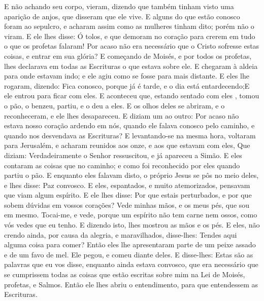 {  E não achando seu corpo, vieram, dizendo que também tinham visto uma aparição de anjos, que disseram que ele vive.
  E alguns do que estão conosco foram ao sepulcro, e
{} acharam assim como as mulheres tinham dito; porém não o viram.
  E ele lhes disse: Ó tolos, e que demoram no coração para crerem em tudo o que os profetas falaram!
  Por acaso não era necessário que o Cristo sofresse estas coisas, e
{} entrar em sua glória?
  E começando de Moisés, e por todos os profetas, lhes declarava em todas as Escrituras o que estava
{} sobre ele.
  E chegaram à aldeia para onde estavam indo; e ele agiu como se fosse para
{} mais distante.
  E eles lhe rogaram, dizendo: Fica conosco, porque já é tarde, e o dia está entardecendo;E ele entrou para ficar com eles.
  E aconteceu que, estando sentado com eles
{}, tomou o pão, o benzeu,
{} partiu, e o deu a eles.
  E os olhos deles se abriram, e o reconheceram, e ele lhes desapareceu.
  E diziam um ao outro: Por acaso não estava nosso coração ardendo em nós, quando ele falava conosco pelo caminho, e quando nos desvendava as Escrituras?
  E levantando-se na mesma hora, voltaram para Jerusalém, e acharam reunidos aos onze, e aos que estavam com eles,
  Que diziam: Verdadeiramente o Senhor ressuscitou, e já apareceu a Simão.
  E eles contaram as coisas que
{} no caminho; e como foi reconhecido por eles quando partiu o pão.
  E enquanto eles falavam disto, o próprio Jesus se pôs no meio deles, e lhes disse: Paz
{} convosco.
  E eles, espantados, e muito atemorizados, pensavam que viam algum espírito.
  E ele lhes disse: Por que estais perturbados, e por que sobem dúvidas em vossos corações?
  Vede minhas mãos, e os meus pés, que sou em mesmo. Tocai-me, e vede, porque um espírito não tem carne nem ossos, como vós vedes que eu tenho.
  E dizendo isto, lhes mostrou as mãos e os pés.
  E eles, não crendo ainda, por causa da alegria, e maravilhados,
{} disse-lhes: Tendes aqui alguma coisa para comer?
  Então eles lhe apresentaram parte de um peixe assado e de um favo de mel.
  Ele pegou, e comeu diante deles.
  E disse-lhes: Estas são as palavras que eu vos disse, enquanto ainda estava convosco, que era necessário que se cumprissem todas as coisas que estão escritas sobre mim na Lei de Moisés,
{} profetas, e
{} Salmos.
  Então ele lhes abriu o entendimento, para que entendessem as Escrituras.
}

